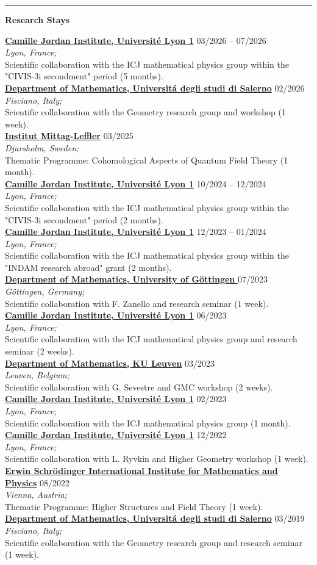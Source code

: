 \documentclass[a4paper]{article}
\newcommand{\block}[1]{\hrule \vspace{0.2cm} \textbf{\Large #1} \vspace{0.2cm}}
\newcommand{\voice}[5]{\href{#4}{\textbf{#1}} \hfill #2 \\ \textit{#3} \\ {\small #5} \vspace{0.2cm} \\}
\begin{document}
    \block{Research Stays}

    
    \voice{Camille Jordan Institute, Université Lyon 1}
        {03/2026 -- 07/2026}
        {Lyon, France;}
        {https://physmath.pages.math.cnrs.fr/}       
        {Scientific collaboration with the ICJ mathematical physics group within the "CIVIS-3i secondment" period (5 months).}
    \voice{Department of Mathematics, Universit\'a degli studi di Salerno}
        {02/2026}
        {Fisciano, Italy;}
        {http://geometria.dipmat.unisa.it/events.html}       
        {Scientific collaboration with the Geometry research group and workshop (1 week).}
    \voice{Institut Mittag-Leffler}
        {03/2025}
        {Djursholm, Sweden;}
        {https://www.mittag-leffler.se/activities/cohomological-aspects-of-quantum-field-theory/}       
        {Thematic Programme: Cohomological Aspects of Quantum Field Theory (1 month).}
    \voice{Camille Jordan Institute, Université Lyon 1}
        {10/2024 -- 12/2024}
        {Lyon, France;}
        {https://physmath.pages.math.cnrs.fr/}       
        {Scientific collaboration with the ICJ mathematical physics group within the "CIVIS-3i secondment" period (2 months).}
    \voice{Camille Jordan Institute, Université Lyon 1}
        {12/2023 -- 01/2024}
        {Lyon, France;}
        {https://physmath.pages.math.cnrs.fr/}       
        {Scientific collaboration with the ICJ mathematical physics group within the "INDAM research abroad" grant (2 months).}
    \voice{Department of Mathematics, University of Göttingen }
        {07/2023}
        {Göttingen, Germany;}
        {https://www.uni-goettingen.de/en/606540.html}       
        {Scientific collaboration with F. Zanello and research seminar (1 week).}
    \voice{Camille Jordan Institute, Université Lyon 1}
        {06/2023}
        {Lyon, France;}
        {https://physmath.pages.math.cnrs.fr/}       
        {Scientific collaboration with the ICJ mathematical physics group and research seminar (2 weeks).}
    \voice{Department of Mathematics, KU Leuven}
        {03/2023}
        {Leuven, Belgium;}
        {https://wis.kuleuven.be/meetkunde/research}       
        {Scientific collaboration with G. Sevestre and GMC workshop (2 weeks).}
    \voice{Camille Jordan Institute, Université Lyon 1}
        {02/2023}
        {Lyon, France;}
        {https://physmath.pages.math.cnrs.fr/}       
        {Scientific collaboration with the ICJ mathematical physics group (1 month).}
    \voice{Camille Jordan Institute, Université Lyon 1}
        {12/2022}
        {Lyon, France;}
        {https://physmath.pages.math.cnrs.fr/}       
        {Scientific collaboration with L. Ryvkin and Higher Geometry workshop (1 week).}
    \voice{Erwin Schrödinger International Institute for Mathematics and Physics}
        {08/2022}
        {Vienna, Austria;}
        {https://www.esi.ac.at/events/e430/}       
        {Thematic Programme: Higher Structures and Field Theory (1 week).}
    \voice{Department of Mathematics, Universit\'a degli studi di Salerno}
        {03/2019}
        {Fisciano, Italy;}
        {http://geometria.dipmat.unisa.it/events.html}       
        {Scientific collaboration with the Geometry research group and research seminar (1 week).}
\end{document}
